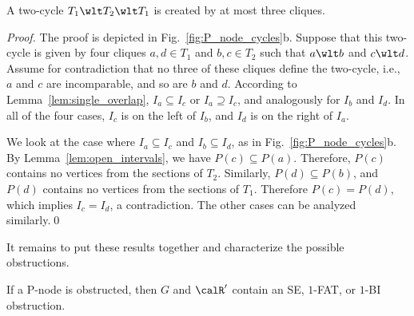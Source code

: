 \begin{lemma} \label{lem:p_node_three_cliques}
A two-cycle $T_1 \wlt T_2 \wlt T_1$ is created by at most three cliques.
\end{lemma}

\begin{proof}
The proof is depicted in Fig.~\ref{fig:P_node_cycles}b. Suppose that this two-cycle is given by four
cliques $a,d \in T_1$ and $b,c \in T_2$ such that $a \wlt b$ and $c \wlt d$. Assume for
contradiction that no three of these cliques define the two-cycle, i.e., $a$ and $c$ are
incomparable, and so are $b$ and $d$. According to Lemma~\ref{lem:single_overlap}, $I_a \subseteq
I_c$ or $I_a \supseteq I_c$, and analogously for $I_b$ and $I_d$. In all of the four cases, $I_c$ is
on the left of $I_b$, and $I_d$ is on the right of $I_a$.

We look at the case where $I_a \subseteq I_c$ and $I_b \subseteq I_d$, as in
Fig.~\ref{fig:P_node_cycles}b. By Lemma~\ref{lem:open_intervals}, we have $P(c) \subseteq P(a)$.
Therefore, $P(c)$ contains no vertices from the sections of $T_2$. Similarly, $P(d) \subseteq P(b)$,
and $P(d)$ contains no vertices from the sections of $T_1$. Therefore $P(c) = P(d)$, which implies
$I_c = I_d$, a contradiction. The other cases can be analyzed similarly.\qed
\end{proof}

It remains to put these results together and characterize the possible obstructions.

\begin{lemma} \label{lem:p_node}
If a P-node is obstructed, then $G$ and $\calR'$ contain an SE, $1$-FAT, or $1$-BI obstruction.
\end{lemma}

